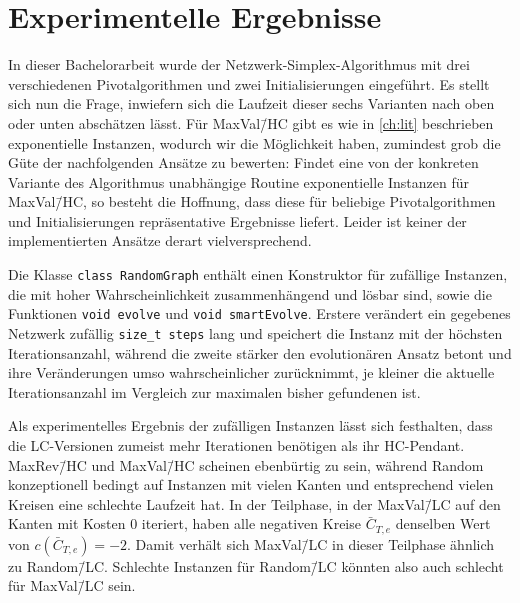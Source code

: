 \chapter{Experimentelle Ergebnisse}\label{ch:erg}
In dieser Bachelorarbeit wurde der Netzwerk-Simplex-Algorithmus mit drei verschiedenen Pivotalgorithmen und zwei Initialisierungen eingeführt. Es stellt sich nun die Frage, inwiefern sich die Laufzeit dieser sechs Varianten nach oben oder unten abschätzen lässt. Für MaxVal\=/HC gibt es wie in \cref{ch:lit} beschrieben exponentielle Instanzen, wodurch wir die Möglichkeit haben, zumindest grob die Güte der nachfolgenden Ansätze zu bewerten: Findet eine von der konkreten Variante des Algorithmus unabhängige Routine exponentielle Instanzen für MaxVal\=/HC, so besteht die Hoffnung, dass diese für beliebige Pivotalgorithmen und Initialisierungen repräsentative Ergebnisse liefert. Leider ist keiner der implementierten Ansätze derart vielversprechend.

Die Klasse \lstinline|class RandomGraph| enthält einen Konstruktor für zufällige Instanzen, die mit hoher Wahrscheinlichkeit zusammenhängend und lösbar sind, sowie die Funktionen \lstinline|void evolve| und \lstinline|void smartEvolve|. Erstere verändert ein gegebenes Netzwerk zufällig \lstinline|size_t steps| lang und speichert die Instanz mit der höchsten Iterationsanzahl, während die zweite stärker den evolutionären Ansatz betont und ihre Veränderungen umso wahrscheinlicher zurücknimmt, je kleiner die aktuelle Iterationsanzahl im Vergleich zur maximalen bisher gefundenen ist.

Als experimentelles Ergebnis der zufälligen Instanzen lässt sich festhalten, dass die LC-Versionen zumeist mehr Iterationen benötigen als ihr HC-Pendant. MaxRev\=/HC und MaxVal\=/HC scheinen ebenbürtig zu sein, während Random konzeptionell bedingt auf Instanzen mit vielen Kanten und entsprechend vielen Kreisen eine schlechte Laufzeit hat. In der Teilphase, in der MaxVal\=/LC auf den Kanten mit Kosten $0$ iteriert, haben alle negativen Kreise $\bar{C}_{T,e}$ denselben Wert von $c(\bar{C}_{T,e})=-2$. Damit verhält sich MaxVal\=/LC in dieser Teilphase ähnlich zu Random\=/LC. Schlechte Instanzen für Random\=/LC könnten also auch schlecht für MaxVal\=/LC sein.

